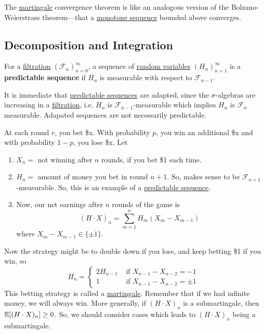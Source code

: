 	The \hyperref[def:martingale]{martingale} convergence theorem is like an analogous version of the Bolzano-Weierstrass theorem---that a \hyperref[st-def:monotone-sequence]{monotone sequence} bounded above converges.

	\subsection{Decomposition and Integration}

	\begin{definition}
	  \label{def:predictable-sequence}
		For a \hyperref[def:filtration]{filtration} $(\mathscr{F}_n)_{n=0}^\infty$, a sequence of \hyperref[prob-def:random-variable]{random variables} $(H_n)_{n=1}^\infty$ is a \textbf{predictable sequence} if $H_n$ is measurable with respect to $\mathscr{F}_{n-1}$. 
	\end{definition}

	It is immediate that \hyperref[def:predictable-sequence]{predictable sequences} are adapted, since the $\sigma$-algebras are increasing in a \hyperref[def:filtration]{filtration}, i.e. $H_n$ is $\mathscr{F}_{n-1}$-measurable which implies $H_n$ is $\mathscr{F}_n$ measurable. Adapated sequences are not necessarily predictable. 

	\begin{example}[Gambling]
	  \label{ex:gambling}
	  At each round $r$, you bet \$x. With probability $p$, you win an additional \$x and with probability $1-p$, you lose \$x. Let 
		\begin{enumerate}
		  \item $X_n = $ not winning after $n$ rounds, if you bet \$1 each time. 
			\item $H_n = $ amount of money you bet in round $n+1$. So, makes sense to be $\mathscr{F}_{n+1}$-measurable. So, this is an example of a \hyperref[def:predictable-sequence]{predictable sequence}. 
			\item Now, our net earnings after $n$ rounds of the game is 
				\begin{equation}
					(H \cdot X)_n = \sum_{m=1}^n H_m (X_m - X_{m-1})
				\end{equation}
				where $X_m - X_{m-1} \in \{\pm 1\}$. 
		\end{enumerate}
		Now the strategy might be to double down if you lose, and keep betting \$1 if you win, so 
		\begin{equation}
			H_n = \begin{cases} 
				2 H_{n-1} & \text{ if } X_{n-1} - X_{n-2} = -1 \\ 
				1 & \text{ if } X_{n-1} - X_{n-2} = \pm 1
			\end{cases} 
		\end{equation}
		This betting strategy is called a \hyperref[def:martingale]{martingale}. Remember that if we had infinite money, we will always win. More generally, if $(H \cdot X)_n$ is a submartingale, then $\operatorname{\mathbb{E}}[(H \cdot X)_n] \geq 0$. So, we should consider cases which leads to $(H \cdot X)_n$ being a submartingale. 
	\end{example}

